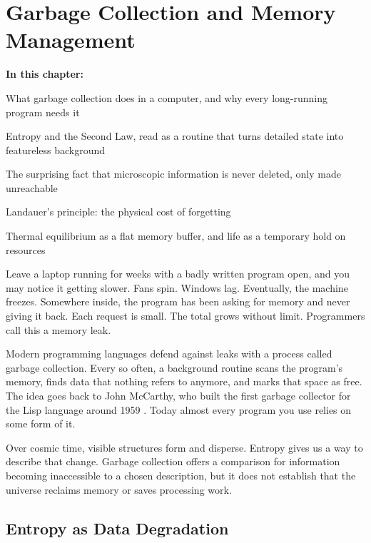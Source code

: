 \chapter{Garbage Collection and Memory Management}

\begin{chaptermapbox}
\textbf{In this chapter:}
\begin{compactchecklist}
\item What garbage collection does in a computer, and why every long-running program needs it
\item Entropy and the Second Law, read as a routine that turns detailed state into featureless background
\item The surprising fact that microscopic information is never deleted, only made unreachable
\item Landauer's principle: the physical cost of forgetting
\item Thermal equilibrium as a flat memory buffer, and life as a temporary hold on resources
\end{compactchecklist}
\end{chaptermapbox}

Leave a laptop running for weeks with a badly written program open, and you may notice it getting slower. Fans spin. Windows lag. Eventually, the machine freezes. Somewhere inside, the program has been asking for memory and never giving it back. Each request is small. The total grows without limit. Programmers call this a memory leak.

Modern programming languages defend against leaks with a process called garbage collection. Every so often, a background routine scans the program's memory, finds data that nothing refers to anymore, and marks that space as free. The idea goes back to John McCarthy, who built the first garbage collector for the Lisp language around 1959 \cite{mccarthy1960}. Today almost every program you use relies on some form of it.

Over cosmic time, visible structures form and disperse. Entropy gives us a way to describe that change. Garbage collection offers a comparison for information becoming inaccessible to a chosen description, but it does not establish that the universe reclaims memory or saves processing work.

\section{Entropy as Data Degradation}

